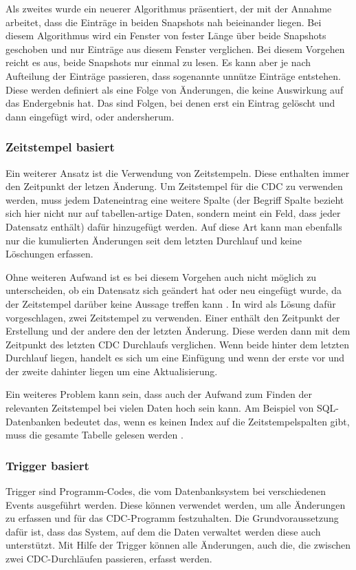 Als zweites wurde ein neuerer Algorithmus präsentiert, der mit der Annahme arbeitet, dass die Einträge in beiden Snapshots nah beieinander liegen.
Bei diesem Algorithmus wird ein Fenster von fester Länge über beide Snapshots geschoben und nur Einträge aus diesem Fenster verglichen.
Bei diesem Vorgehen reicht es aus, beide Snapshots nur einmal zu lesen.
Es kann aber je nach Aufteilung der Einträge passieren, dass sogenannte unnütze Einträge entstehen.
Diese werden definiert als eine Folge von Änderungen, die keine Auswirkung auf das Endergebnis hat.
Das sind Folgen, bei denen erst ein Eintrag gelöscht und dann eingefügt wird, oder andersherum.

\subsubsection{Zeitstempel basiert}
Ein weiterer Ansatz ist die Verwendung von Zeitstempeln.
Diese enthalten immer den Zeitpunkt der letzen Änderung.
Um Zeitstempel für die CDC zu verwenden werden, muss jedem Dateneintrag eine weitere Spalte (der Begriff Spalte bezieht sich hier nicht nur auf tabellen-artige Daten, sondern meint ein Feld, dass jeder Datensatz enthält) dafür hinzugefügt werden.
Auf diese Art kann man ebenfalls nur die kumulierten Änderungen seit dem letzten Durchlauf und keine Löschungen erfassen.

Ohne weiteren Aufwand ist es bei diesem Vorgehen auch nicht möglich zu unterscheiden, ob ein Datensatz sich geändert hat oder neu eingefügt wurde, da der Zeitstempel darüber keine Aussage treffen kann \cite{delta-view_gen}.
In \cite{cdc_in_nosql} wird als Lösung dafür vorgeschlagen, zwei Zeitstempel zu verwenden. Einer enthält den Zeitpunkt der Erstellung und der andere den der letzten Änderung. Diese werden dann mit dem Zeitpunkt des letzten CDC Durchlaufs verglichen. Wenn beide hinter dem letzten Durchlauf liegen, handelt es sich um eine Einfügung und wenn der erste vor und der zweite dahinter liegen um eine Aktualisierung.

Ein weiteres Problem kann sein, dass auch der Aufwand zum Finden der relevanten Zeitstempel bei vielen Daten hoch sein kann. Am Beispiel von SQL-Datenbanken bedeutet das, wenn es keinen Index auf die Zeitstempelspalten gibt, muss die gesamte Tabelle gelesen werden \cite{boeing}.

\subsubsection{Trigger basiert}
Trigger sind Programm-Codes, die vom Datenbanksystem bei verschiedenen Events ausgeführt werden.
Diese können verwendet werden, um alle Änderungen zu erfassen und für das CDC-Programm festzuhalten.
Die Grundvoraussetzung dafür ist, dass das System, auf dem die Daten verwaltet werden diese auch unterstützt.
Mit Hilfe der Trigger können alle Änderungen, auch die, die zwischen zwei CDC-Durchläufen passieren, erfasst werden.

